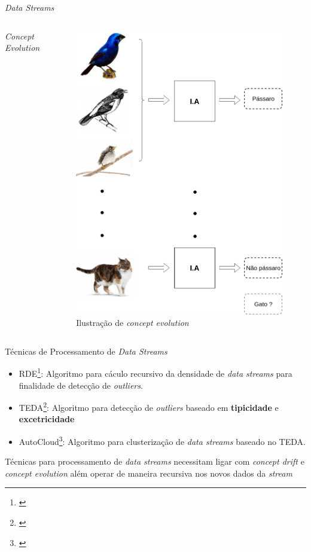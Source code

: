 \begin{frame}{\textit{Data Streams}}
\begin{columns}
	    \centering
	        \textit{Concept Evolution}
	        \begin{figure}
        	    \centering
        	    \includegraphics[width=\textwidth,height=.55\textheight,keepaspectratio]{figuras/passaros_gatos.png}
        	    \caption{Ilustração de \textit{concept evolution}}
        	    \label{fig:concept_evolution}
        	\end{figure}
	\end{columns}
\end{frame}


\begin{frame}{Técnicas de Processamento de \textit{Data Streams}}
	\begin{itemize}
	    \item RDE\footnote{\cite{angelov2012autonomous}}: Algoritmo para cáculo recursivo da densidade de \textit{data streams} para finalidade de detecção de \textit{outliers}.
	    \item TEDA\footnote{\cite{angelov2014anomaly}}: Algoritmo para detecção de \textit{outliers} baseado em \textbf{tipicidade} e \textbf{excetricidade}
	    \item AutoCloud\footnote{\cite{bezerra2017abordagem}}: Algoritmo para clusterização de \textit{data streams} baseado no TEDA.
	\end{itemize}
	\pause

	Técnicas para processamento de \textit{data streams} necessitam ligar com \textit{concept drift} e \textit{concept evolution} além operar de maneira recursiva nos novos dados da \textit{stream}
\end{frame}